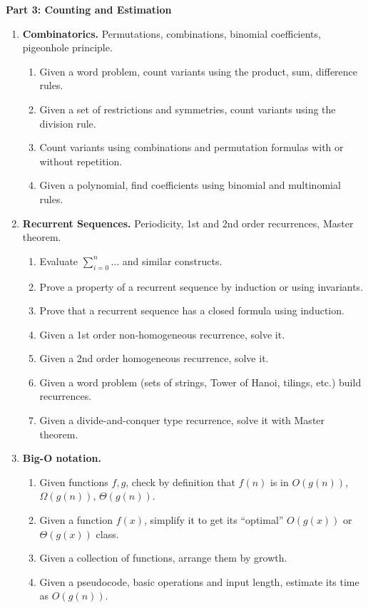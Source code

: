 \documentclass[a4paper,12pt]{article}
\begin{document}
\vspace{10pt}
{\bf Part 3: Counting and Estimation}


{\small
\begin{enumerate}
\item \textbf{Combinatorics.} Permutations, combinations, binomial coefficients, pigeonhole principle.
\begin{enumerate}
\item Given a word problem, count variants using the product, sum, difference rules.
\item Given a set of restrictions and symmetries, count variants using the division rule.
\item Count variants using 
combinations and permutation formulas with or without repetition.
\item Given a polynomial, find coefficients using binomial and multinomial rules.
\end{enumerate}

\item \textbf{Recurrent Sequences.} Periodicity, 1st and 2nd order recurrences, Master theorem.
\begin{enumerate}
\item Evaluate $\sum\limits_{i=0}^n \ldots$ and similar constructs.
\item Prove a property of a recurrent sequence by induction or using invariants.
\item Prove that a recurrent sequence has a closed formula using induction.
\item Given a 1st order non-homogeneous recurrence, solve it.
\item Given a 2nd order homogeneous recurrence, solve it.
\item Given a word problem (sets of strings, Tower of Hanoi, tilings, etc.) build recurrences.
\item Given a divide-and-conquer type recurrence, solve it with Master theorem.
\end{enumerate}


\item \textbf{Big-O notation.} 
\begin{enumerate}
\item Given functions $f,g$, check by definition that $f(n)$ is in $O(g(n))$, $\Omega(g(n))$, $\Theta(g(n))$.
\item Given a function $f(x)$, simplify it to get its ``optimal'' $O(g(x))$ or $\Theta(g(x))$ class.
\item Given a collection of functions, arrange them by growth.
\item Given a pseudocode, basic operations and input length, estimate its time as $O(g(n))$.
\end{enumerate}
\end{enumerate}
}
\end{document}
